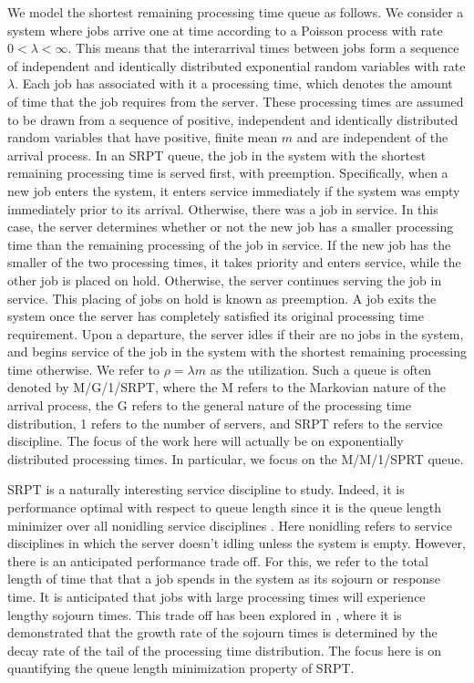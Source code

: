 \documentclass[12pt]{article}
\theoremstyle{plain}
\theoremstyle{definition}
\theoremstyle{remark}
\begin{document}
We model the shortest remaining processing time queue as follows.  We consider a system where jobs arrive one at time according to a Poisson process with rate $0<\lambda<\infty$.  This means that the interarrival times between jobs form a sequence of independent and identically distributed exponential random variables with rate $\lambda$.  Each job has associated with it a processing time, which denotes the amount of time that the job requires from the server.
These processing times are assumed to be drawn from a sequence of positive, independent and identically distributed random
variables that have positive, finite mean $m$ and are independent of the arrival process.  In an SRPT
queue, the job in the system with the shortest remaining processing time is served first, with preemption.
Specifically, when a new job enters the system, it enters service immediately if the system was empty immediately prior to its arrival.
Otherwise, there was a job in service.  In this case, the server determines whether or not the new job has a
smaller processing time than the remaining processing of the job in service.  If the new job has the smaller
of the two processing times, it takes priority and enters service, while the other job is placed on hold. Otherwise, the server continues serving the job in service.
This placing of jobs on hold is known as preemption.  A job exits the system once the server has completely satisfied
its original processing time requirement.  Upon a departure, the server idles if their are no jobs in the system, and begins service of
the job in the system with the shortest remaining processing time otherwise.  We refer to $\rho=\lambda m$ as the utilization.
Such a queue is often denoted by M/G/1/SRPT, where the M refers to the Markovian nature of the arrival process, the
G refers to the general nature of the processing time distribution, 1 refers to the number of servers, and SRPT
refers to the service discipline.  The focus of the work here will actually be on exponentially distributed processing times.  In particular, we focus on the M/M/1/SPRT queue.

SRPT is a naturally interesting service discipline to study.  Indeed, it is performance optimal with respect to queue length since it is the queue length minimizer over all nonidling service disciplines \cite{sch68, smi76}.  Here nonidling refers to service disciplines in which the server doesn't idling unless the system is empty.  However, there is  an anticipated performance trade off.  For this, we refer to the total length of time that that a job spends in the system as its sojourn or response time.  It is anticipated that jobs with large processing times will experience lengthy sojourn times. This trade off has been explored in \cite{dow09}, where it is demonstrated that the growth rate of the sojourn times is determined by the decay rate of the tail of the processing time distribution.  The focus here is on quantifying the queue length minimization property of SRPT.
\end{document}

